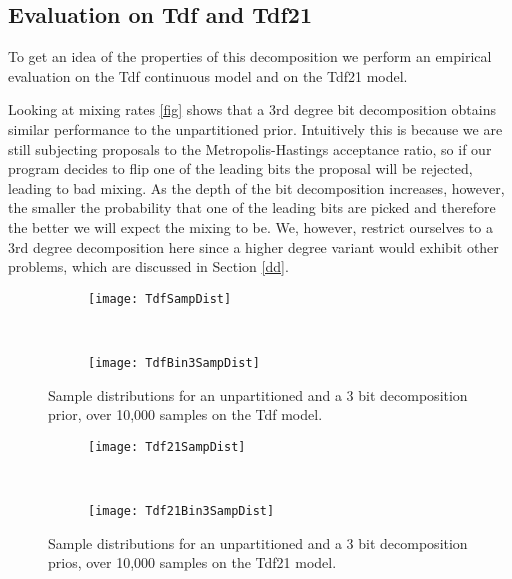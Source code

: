 \subsection{Evaluation on Tdf and Tdf21}

To get an idea of the properties of this decomposition we perform an empirical evaluation on the Tdf continuous model and on the Tdf21 model.

Looking at mixing rates \ref{fig} shows that a 3rd degree bit decomposition obtains similar performance to the unpartitioned prior. Intuitively this is because we are still subjecting proposals to the Metropolis-Hastings acceptance ratio, so if our program decides to flip one of the leading bits the proposal will be rejected, leading to bad mixing. As the depth of the bit decomposition increases, however, the smaller the probability that one of the leading bits are picked and therefore the better we will expect the mixing to be.  We, however, restrict ourselves to a 3rd degree decomposition here since a higher degree variant would exhibit other problems, which are discussed in Section \ref{dd}.

\begin{figure}[h]
    \centering
    \begin{subfigure}[t]{0.48\textwidth}
      \texttt{[image: TdfSampDist]}
    \end{subfigure}
    ~
    \begin{subfigure}[t]{0.48\textwidth}
      \texttt{[image: TdfBin3SampDist]}
    \end{subfigure}
    \caption{Sample distributions for an unpartitioned and a 3 bit decomposition prior, over 10,000 samples on the Tdf model.}
    \label{fig:tdf21PSampDist}
\end{figure}

\begin{figure}[h]
    \centering
    \begin{subfigure}[t]{0.48\textwidth}
      \texttt{[image: Tdf21SampDist]}
    \end{subfigure}
    ~
    \begin{subfigure}[t]{0.48\textwidth}
      \texttt{[image: Tdf21Bin3SampDist]}
    \end{subfigure}
    \caption{Sample distributions for an unpartitioned and a 3 bit decomposition prios, over 10,000 samples on the Tdf21 model.}
    \label{fig:tdf21PSampDist}
\end{figure}

